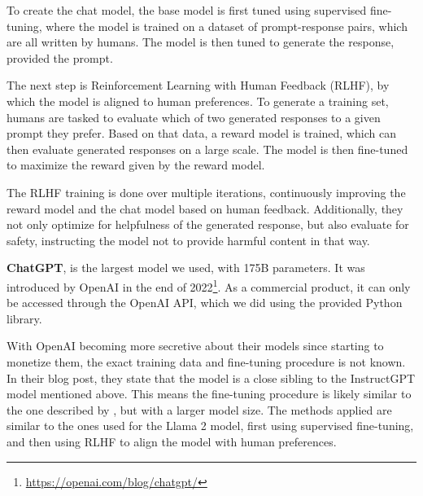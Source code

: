 To create the chat model, the base model is first tuned using supervised fine-tuning, where the model is trained on a dataset of prompt-response pairs, which are all written by humans.
The model is then tuned to generate the response, provided the prompt.

The next step is Reinforcement Learning with Human Feedback (RLHF), by which the model is aligned to human preferences. 
To generate a training set, humans are tasked to evaluate which of two generated responses to a given prompt they prefer.
Based on that data, a reward model is trained, which can then evaluate generated responses on a large scale.
The model is then fine-tuned to maximize the reward given by the reward model.

The RLHF training is done over multiple iterations, continuously improving the reward model and the chat model based on human feedback.
Additionally, they not only optimize for helpfulness of the generated response, but also evaluate for safety, instructing the model not to provide harmful content in that way.


\textbf{ChatGPT}, is the largest model we used, with 175B parameters. 
It was introduced by OpenAI in the end of 2022\footnote{\url{https://openai.com/blog/chatgpt/}}.
As a commercial product, it can only be accessed through the OpenAI API, which we did using the provided Python library.

With OpenAI becoming more secretive about their models since starting to monetize them, the exact training data and fine-tuning procedure is not known.
In their blog post, they state that the model is a close sibling to the InstructGPT model mentioned above.
This means the fine-tuning procedure is likely similar to the one described by \cite{ouyang:2022:Training}, but with a larger model size.
The methods applied are similar to the ones used for the Llama 2 model, first using supervised fine-tuning, and then using RLHF to align the model with human preferences.


